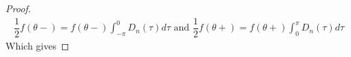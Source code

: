 \begin{proof}
	\begin{align*}
	\dfrac{1}{2} f(\theta-) = f(\theta-) \int_{-\pi}^0 D_n(\tau)d\tau \text{ and } \dfrac{1}{2}f(\theta+) = f(\theta+) \int_0^\pi D_n (\tau)d\tau
	\end{align*}
	Which gives 
\end{proof}

